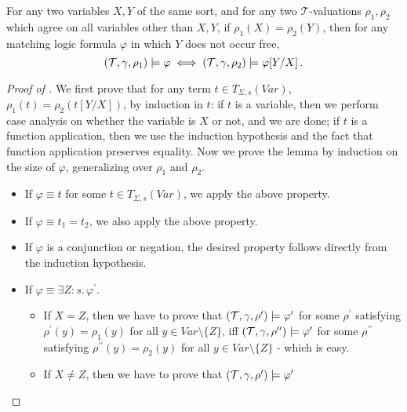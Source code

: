 \begin{lemma}\label{lem:varrenamesem}
    For any two variables $X,Y$ of the same sort, and for any two $\mathcal{T}$-valuations $\rho_1, \rho_2$
    which agree on all variables other than $X,Y$, if $\rho_1(X) = \rho_2(Y)$, then for any matching logic formula
    $\varphi$ in which $Y$ does not occur free,
    \begin{equation*}
        (\mathcal{T}, \gamma, \rho_1) \models \varphi \iff (\mathcal{T}, \gamma, \rho_2) \models \varphi[Y/X] \, .
    \end{equation*}
  \end{lemma}
  \begin{proof}[Proof of ]
      We first prove that for any term $t \in T_{\Sigma, s}(\mathit{Var})$,
      $\rho_1(t) = \rho_2(t[Y/X])$, by induction in $t$:
      if $t$ is a variable, then we perform case analysis on whether the variable is $X$ or not, and we are done;
      if $t$ is a function application, then we use the induction hypothesis and the fact that function application preserves equality.
      Now we prove the lemma by induction on the size of $\varphi$, generalizing over $\rho_1$ and $\rho_2$.
      \begin{itemize}
          \item If $\varphi \equiv t$ for some $t \in T_{\Sigma, s}(\mathit{Var})$, we apply the above property.
          \item If $\varphi \equiv t_1 = t_2$, we also apply the above property.
          \item If $\varphi$ is a conjunction or negation, the desired property follows directly from the induction hypothesis.
          \item If $\varphi \equiv \exists Z : s.\, \varphi^\prime$.
          \begin{itemize}
              \item If $X = Z$, then we have to prove that $(\mathcal{T}, \gamma, \rho^\prime) \models \varphi^\prime$
              for some $\rho^\prime$ satisfying $\rho^\prime(y) = \rho_1(y)$ for all $y \in \mathit{Var} \setminus \{ Z \}$, iff $(\mathcal{T}, \gamma, \rho^{\prime\prime}) \models \varphi^\prime$
              for some $\rho^{\prime\prime}$ satisfying $\rho^{\prime\prime}(y) = \rho_2(y)$ for all $y \in \mathit{Var} \setminus \{ Z \}$ - which is easy.
              \item If $X \not = Z$, then we have to prove that
              $(\mathcal{T}, \gamma, \rho^\prime) \models \varphi^\prime$

\end{itemize}
\end{itemize}
\end{proof}
